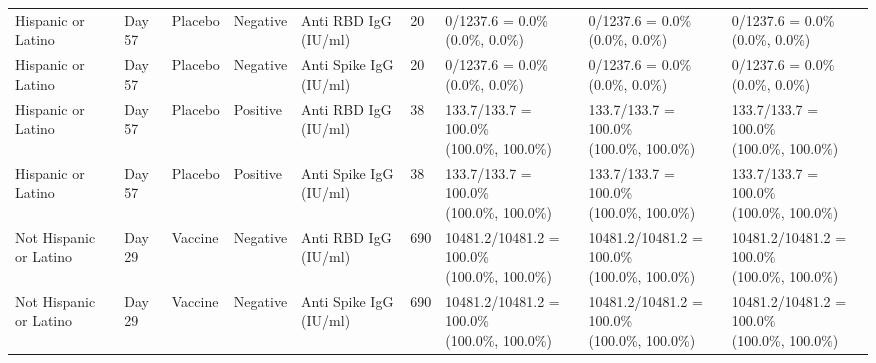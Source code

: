 \documentclass[]{book}
\theoremstyle{definition}
\theoremstyle{definition}
\theoremstyle{definition}
\newcommand{\1}{\mathbbm{1}}
\begin{document}
\begin{landscape}
\begin{ThreePartTable}
\begin{longtable}[t]{>{\raggedright\arraybackslash}p{2.7cm}llllllll}
\hspace{1em}Hispanic or Latino & Day 57 & Placebo & Negative & Anti RBD IgG (IU/ml) & 20 & \makecell[l]{0/1237.6 = 0.0\%\\(0.0\%, 0.0\%)} & \makecell[l]{0/1237.6 = 0.0\%\\(0.0\%, 0.0\%)} & \makecell[l]{0/1237.6 = 0.0\%\\(0.0\%, 0.0\%)}\\
\hspace{1em}Hispanic or Latino & Day 57 & Placebo & Negative & Anti Spike IgG (IU/ml) & 20 & \makecell[l]{0/1237.6 = 0.0\%\\(0.0\%, 0.0\%)} & \makecell[l]{0/1237.6 = 0.0\%\\(0.0\%, 0.0\%)} & \makecell[l]{0/1237.6 = 0.0\%\\(0.0\%, 0.0\%)}\\
\hspace{1em}Hispanic or Latino & Day 57 & Placebo & Positive & Anti RBD IgG (IU/ml) & 38 & \makecell[l]{133.7/133.7 = 100.0\%\\(100.0\%, 100.0\%)} & \makecell[l]{133.7/133.7 = 100.0\%\\(100.0\%, 100.0\%)} & \makecell[l]{133.7/133.7 = 100.0\%\\(100.0\%, 100.0\%)}\\
\hspace{1em}Hispanic or Latino & Day 57 & Placebo & Positive & Anti Spike IgG (IU/ml) & 38 & \makecell[l]{133.7/133.7 = 100.0\%\\(100.0\%, 100.0\%)} & \makecell[l]{133.7/133.7 = 100.0\%\\(100.0\%, 100.0\%)} & \makecell[l]{133.7/133.7 = 100.0\%\\(100.0\%, 100.0\%)}\\
\hspace{1em}Not Hispanic or Latino & Day 29 & Vaccine & Negative & Anti RBD IgG (IU/ml) & 690 & \makecell[l]{10481.2/10481.2 = 100.0\%\\(100.0\%, 100.0\%)} & \makecell[l]{10481.2/10481.2 = 100.0\%\\(100.0\%, 100.0\%)} & \makecell[l]{10481.2/10481.2 = 100.0\%\\(100.0\%, 100.0\%)}\\
\hspace{1em}Not Hispanic or Latino & Day 29 & Vaccine & Negative & Anti Spike IgG (IU/ml) & 690 & \makecell[l]{10481.2/10481.2 = 100.0\%\\(100.0\%, 100.0\%)} & \makecell[l]{10481.2/10481.2 = 100.0\%\\(100.0\%, 100.0\%)} & \makecell[l]{10481.2/10481.2 = 100.0\%\\(100.0\%, 100.0\%)}\\

\end{longtable}
\end{ThreePartTable}
\end{landscape}
\end{document}
